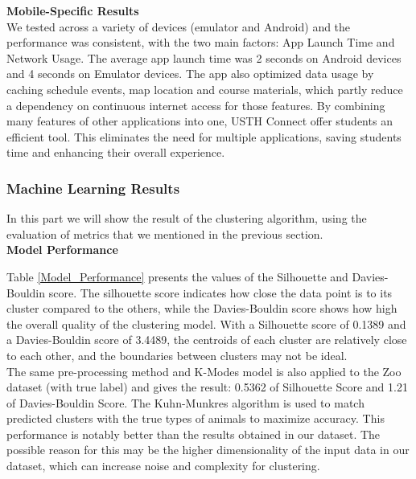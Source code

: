 \documentclass[12pt]{article}
\begin{document}
\textbf{Mobile-Specific Results} \\

We tested across a variety of devices (emulator and Android) and the performance was consistent, with the two main factors: App Launch Time and Network Usage. The average app launch time was 2 seconds on Android devices and 4 seconds on Emulator devices. The app also optimized data usage by caching schedule events, map location and course materials, which partly reduce a dependency on continuous internet access for those features. 
By combining many features of other applications into one, USTH Connect offer students an efficient tool. This eliminates the need for multiple applications, saving students time and enhancing their overall experience.

\subsubsection{Machine Learning Results}
In this part we will show the result of the clustering algorithm, using the evaluation of
metrics that we mentioned in the previous section. \\

\textbf{Model Performance} \\

\begin{table}[H]
\centering
{}
\caption{Model Performance}
\label{Model_Performance}
\end{table}

Table \ref{Model_Performance} presents the values of the Silhouette and Davies-Bouldin score. The silhouette score indicates how close the data point is to its cluster compared to the others, while the Davies-Bouldin score shows how high the overall quality of the clustering model. With a Silhouette score of 0.1389 and a Davies-Bouldin score of 3.4489, the centroids of each cluster are relatively close to each other, and the boundaries between clusters may not be ideal.\\

The same pre-processing method and K-Modes model is also applied to the Zoo dataset (with true label) and gives the result: 0.5362 of Silhouette Score and 1.21 of Davies-Bouldin Score. The Kuhn-Munkres\citep{zhu2011efficient} algorithm is used to match predicted clusters with the true types of animals to maximize accuracy. This performance is notably better than the results obtained in our dataset. The possible reason for this may be the higher dimensionality of the input data in our dataset, which can increase noise and complexity for clustering.\\ 
\end{document}
